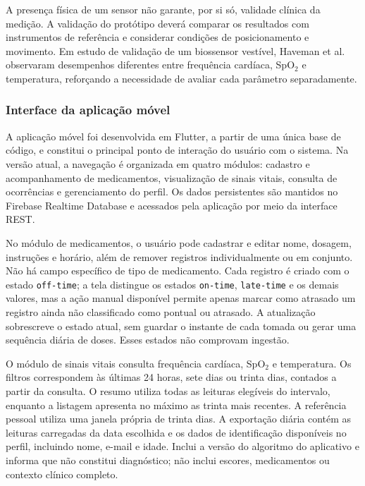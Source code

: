 \documentclass[12pt]{article}
\begin{document}
A presença física de um sensor não garante, por si só, validade clínica da medição. A validação do protótipo deverá comparar os resultados com instrumentos de referência e considerar condições de posicionamento e movimento. Em estudo de validação de um biossensor vestível, Haveman et al. \cite{haveman2021continuous} observaram desempenhos diferentes entre frequência cardíaca, SpO$_2$ e temperatura, reforçando a necessidade de avaliar cada parâmetro separadamente.

\subsubsection{Interface da aplicação móvel}

A aplicação móvel foi desenvolvida em Flutter, a partir de uma única base de código, e constitui o principal ponto de interação do usuário com o sistema. Na versão atual, a navegação é organizada em quatro módulos: cadastro e acompanhamento de medicamentos, visualização de sinais vitais, consulta de ocorrências e gerenciamento do perfil. Os dados persistentes são mantidos no Firebase Realtime Database e acessados pela aplicação por meio da interface REST.

No módulo de medicamentos, o usuário pode cadastrar e editar nome, dosagem, instruções e horário, além de remover registros individualmente ou em conjunto. Não há campo específico de tipo de medicamento. Cada registro é criado com o estado \texttt{off-time}; a tela distingue os estados \texttt{on-time}, \texttt{late-time} e os demais valores, mas a ação manual disponível permite apenas marcar como atrasado um registro ainda não classificado como pontual ou atrasado. A atualização sobrescreve o estado atual, sem guardar o instante de cada tomada ou gerar uma sequência diária de doses. Esses estados não comprovam ingestão.

O módulo de sinais vitais consulta frequência cardíaca, SpO$_2$ e temperatura. Os filtros correspondem às últimas 24 horas, sete dias ou trinta dias, contados a partir da consulta. O resumo utiliza todas as leituras elegíveis do intervalo, enquanto a listagem apresenta no máximo as trinta mais recentes. A referência pessoal utiliza uma janela própria de trinta dias. A exportação diária contém as leituras carregadas da data escolhida e os dados de identificação disponíveis no perfil, incluindo nome, e-mail e idade. Inclui a versão do algoritmo do aplicativo e informa que não constitui diagnóstico; não inclui escores, medicamentos ou contexto clínico completo.
\end{document}
